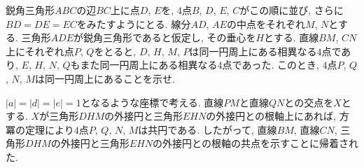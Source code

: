 \begin{bprb}[EGMO2025-3]
鋭角三角形$ABC$の辺$BC$上に点$D$, $E$を, $4$点$B$, $D$, $E$, $C$がこの順に並び, さらに$BD=DE=EC$をみたすようにとる.
線分$AD$, $AE$の中点をそれぞれ$M$, $N$とする.
三角形$ADE$が鋭角三角形であると仮定し, その垂心を$H$とする.
直線$BM$, $CN$上にそれぞれ点$P$, $Q$をとると, $D$, $H$, $M$, $P$は同一円周上にある相異なる$4$点であり, $E$, $H$, $N$, $Q$もまた同一円周上にある相異なる$4$点であった.
このとき, $4$点$P$, $Q$, $N$, $M$は同一円周上にあることを示せ.
\end{bprb}
\begin{ifsol*}
$\lvert a\rvert=\lvert d\rvert=\lvert e\rvert=1$となるような座標で考える.
直線$PM$と直線$QN$との交点を$X$とする.
$X$が三角形$DHM$の外接円と三角形$EHN$の外接円との根軸上にあれば, 方冪の定理により$4$点$P$, $Q$, $N$, $M$は共円である.
したがって, 直線$BM$, 直線$CN$, 三角形$DHM$の外接円と三角形$EHN$の外接円との根軸の共点を示すことに帰着された.


\end{ifsol*}
